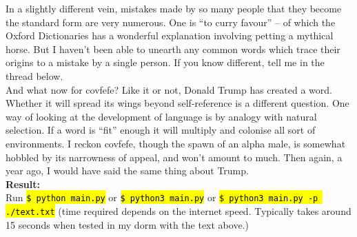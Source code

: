 \documentclass[12pt]{article}
\newcommand{\hltexttt}[1]{\texttt{\hl{#1}}}
\begin{document}
In a slightly different vein, mistakes made by so many people that they become the standard form are very numerous. One is “to curry favour” – of which the Oxford Dictionaries has a wonderful explanation involving petting a mythical horse. But I haven’t been able to unearth any common words which trace their origins to a mistake by a single person. If you know different, tell me in the thread below.\\

And what now for covfefe? Like it or not, Donald Trump has created a word. Whether it will spread its wings beyond self-reference is a different question. One way of looking at the development of language is by analogy with natural selection. If a word is “fit” enough it will multiply and colonise all sort of environments. I reckon covfefe, though the spawn of an alpha male, is somewhat hobbled by its narrowness of appeal, and won’t amount to much. Then again, a year ago, I would have said the same thing about Trump. \\

\noindent \textbf{Result:}\\
\noindent Run \hltexttt{\$ python main.py} or \hltexttt{\$ python3 main.py} or \hltexttt{\$ python3 main.py -p ./text.txt} (time required depends on the internet speed. Typically takes around 15 seconds when tested in my dorm with the text above.)\\
\end{document}
